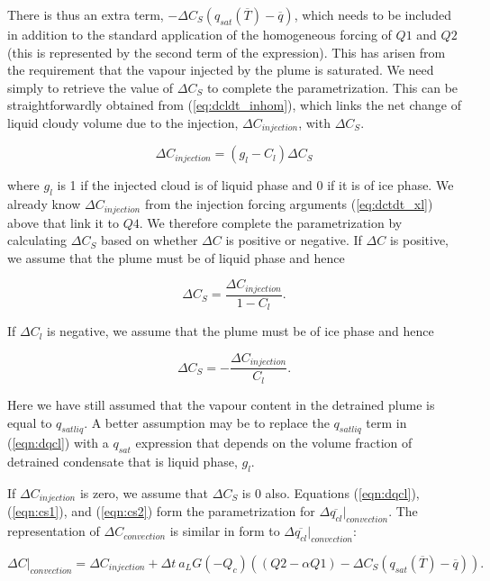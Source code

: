 \documentclass{UMDP_article}
\begin{document}
There is thus an extra term, $-\Delta C_S  (q_{sat}(\overline{T})-\overline{q} )$,
which needs to be included in addition to the standard application of the homogeneous
forcing of $Q1$ and $Q2$ (this is represented
by the second term of the expression). This has arisen from the requirement that
the vapour injected by the plume is saturated. We need simply
to retrieve the value of $\Delta C_S$ to complete the parametrization.
This can be straightforwardly obtained
from (\ref{eq:dcldt_inhom}), which links the net change of liquid cloudy volume
due to the injection, $\Delta C_{injection}$, with $\Delta C_S$.

\begin{equation}
\Delta C_{injection} = (g_l - C_l) \Delta C_S
\end{equation}

where $g_l$ is 1 if the injected cloud is of liquid phase and 0 if it
is of ice phase. We already know $\Delta C_{injection}$ from the
injection forcing arguments (\ref{eq:dctdt_xl}) above that link it to $Q4$.
We therefore complete the parametrization by calculating $\Delta C_S$ based
on whether $\Delta C$ is positive or negative. If $\Delta C$ is positive,
we assume that the plume must be of liquid phase and hence

\begin{equation}
\Delta C_S = \frac{\Delta C_{injection}} {1 -C_l} .
\label{eqn:cs1}
\end{equation}

If $\Delta C_l$ is negative, we assume that the plume must be of ice phase and hence

\begin{equation}
\Delta C_S = - \frac{\Delta C_{injection}} {C_l} .
\label{eqn:cs2}
\end{equation}

Here we have still assumed that the vapour content in the detrained plume is equal to
$q_{sat liq}$. A better assumption may be to replace the $q_{sat liq}$ term in
(\ref{eqn:dqcl})  with a $q_{sat}$ expression that depends on the volume fraction
of detrained condensate that is liquid phase, $g_l$.

If $\Delta C_{injection}$ is zero, we assume that $\Delta C_S$ is 0 also. Equations
(\ref{eqn:dqcl}),(\ref{eqn:cs1}), and (\ref{eqn:cs2}) form the parametrization
for $\Delta \overline{q_{cl}}|_{convection}$. The
representation of $\Delta C_{convection}$ is similar in form to 
$\Delta \overline{q_{cl}}|_{convection}$:

\begin{equation}
\Delta C |_{convection} = \Delta C_{injection}
+ \Delta t ~ a_L G(-Q_c) (  ( Q2 - \alpha Q1) - \Delta C_S  (q_{sat}(\overline{T}) 
- \overline{q} ) ) .
\end{equation}
\end{document}
